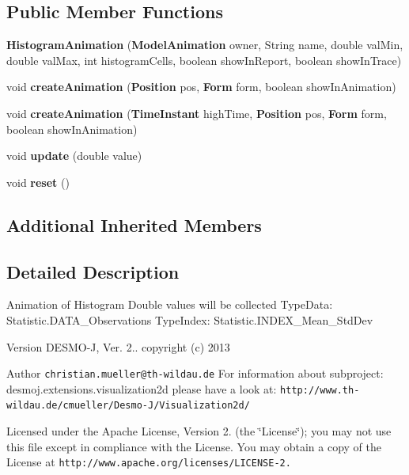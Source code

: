 \subsection*{Public Member Functions}
\begin{DoxyCompactItemize}
\item 
{\bf Histogram\-Animation} ({\bf Model\-Animation} owner, String name, double val\-Min, double val\-Max, int histogram\-Cells, boolean show\-In\-Report, boolean show\-In\-Trace)
\item 
void {\bf create\-Animation} ({\bf Position} pos, {\bf Form} form, boolean show\-In\-Animation)
\item 
void {\bf create\-Animation} ({\bf Time\-Instant} high\-Time, {\bf Position} pos, {\bf Form} form, boolean show\-In\-Animation)
\item 
void {\bf update} (double value)
\item 
void {\bfseries reset} ()\label{classdesmoj_1_1extensions_1_1visualization2d_1_1animation_1_1core_1_1statistic_1_1_histogram_animation_a78a79ecb4c03240b11c4328177b42484}

\end{DoxyCompactItemize}
\subsection*{Additional Inherited Members}


\subsection{Detailed Description}
Animation of Histogram Double values will be collected Type\-Data\-: Statistic.\-D\-A\-T\-A\-\_\-\-Observations Type\-Index\-: Statistic.\-I\-N\-D\-E\-X\-\_\-\-Mean\-\_\-\-Std\-Dev

\begin{DoxyVersion}{Version}
D\-E\-S\-M\-O-\/\-J, Ver. 2.. copyright (c) 2013 
\end{DoxyVersion}
\begin{DoxyAuthor}{Author}
{\tt christian.\-mueller@th-\/wildau.\-de} For information about subproject\-: desmoj.\-extensions.\-visualization2d please have a look at\-: {\tt http\-://www.\-th-\/wildau.\-de/cmueller/\-Desmo-\/\-J/\-Visualization2d/}
\end{DoxyAuthor}
Licensed under the Apache License, Version 2. (the \char`\"{}\-License\char`\"{}); you may not use this file except in compliance with the License. You may obtain a copy of the License at {\tt http\-://www.\-apache.\-org/licenses/\-L\-I\-C\-E\-N\-S\-E-\/2.}

